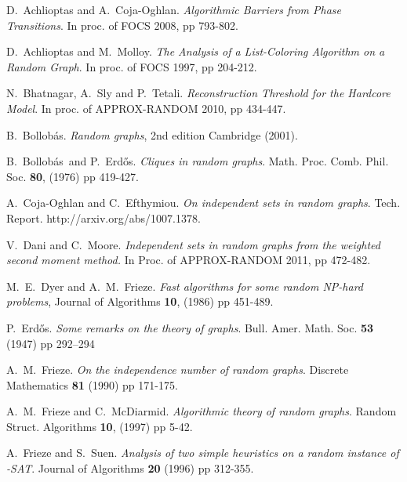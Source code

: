 \documentclass[a4paper,10pt]{article}
\newcommand{\Erdos}{Erd\H{o}s}
\newcommand{\Bollobas}{Bollob\'as}
\begin{document}
\begin{thebibliography}{00}


D.~Achlioptas and A.~Coja-Oghlan. 
{\em Algorithmic Barriers from Phase Transitions}.  
In proc. of FOCS 2008, pp 793-802.



 D.~Achlioptas and M.~Molloy. 
{\em The Analysis of a List-Coloring Algorithm on a Random Graph}. 
In proc. of FOCS 1997, pp 204-212.



 N.~Bhatnagar, A.~Sly and P.~Tetali. 
{\em Reconstruction Threshold for the Hardcore Model}. 
In proc. of APPROX-RANDOM 2010, pp 434-447.



 B.~\Bollobas. 
{\em Random graphs},
2nd edition Cambridge (2001).



 B.~\Bollobas~and P.~\Erdos. 
{\em Cliques in random graphs}.
Math. Proc. Comb. Phil. Soc. \textbf{80}, (1976) pp 419-427.


 A.~Coja-Oghlan and C.~Efthymiou.
{\em On independent sets in random graphs}. Tech. Report.
http://arxiv.org/abs/1007.1378.

 V.~Dani and C.~Moore. {\em Independent sets in
random graphs from the weighted second moment method.} 
In Proc. of APPROX-RANDOM 2011, pp 472-482.


 M.~E.~Dyer and A.~M.~Frieze. 
{\em Fast algorithms for some random NP-hard problems}, 
Journal of Algorithms \textbf{10}, (1986) pp 451-489.



 P.~\Erdos. 
{\em Some remarks on the theory of graphs}. 
Bull. Amer. Math. Soc. \textbf{53} (1947) pp 292--294



 A.~M.~Frieze. 
{\em  On the independence number of random graphs}. 
Discrete Mathematics \textbf{81} (1990) pp 171-175.



 A.~M.~Frieze and C.~McDiarmid.
{\em Algorithmic theory of random graphs}. 
Random Struct. Algorithms \textbf{10}, (1997) pp 5-42.



 A.~Frieze and  S.~Suen. 
{\em Analysis of two simple heuristics on a random instance of -SAT}. 
Journal of Algorithms \textbf{20} (1996) pp 312-355.



\end{thebibliography}
\end{document}
